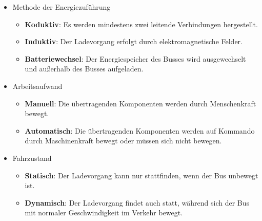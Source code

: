 \documentclass{scrreprt}
\begin{document}
\begin{itemize}
	\item Methode der Energiezuführung
	\begin{itemize}
		\item \textbf{Koduktiv}: Es werden mindestens zwei leitende Verbindungen hergestellt.
		\item \textbf{Induktiv}: Der Ladevorgang erfolgt durch elektromagnetische Felder.
		\item \textbf{Batteriewechsel}: Der Energiespeicher des Busses wird ausgewechselt und außerhalb des Busses aufgeladen.
	\end{itemize}
	\item Arbeitsaufwand
	\begin{itemize}
		\item \textbf{Manuell}: Die übertragenden Komponenten werden durch Menschenkraft bewegt.
		\item \textbf{Automatisch}: Die übertragenden Komponenten werden auf Kommando durch Maschinenkraft bewegt oder müssen sich nicht bewegen.
	\end{itemize}
	\item Fahrzustand
	\begin{itemize}
		\item \textbf{Statisch}: Der Ladevorgang kann nur stattfinden, wenn der Bus unbewegt ist.
		\item \textbf{Dynamisch}: Der Ladevorgang findet auch statt, während sich der Bus mit normaler Geschwindigkeit im Verkehr bewegt.
	\end{itemize}
\end{itemize}
\end{document}
